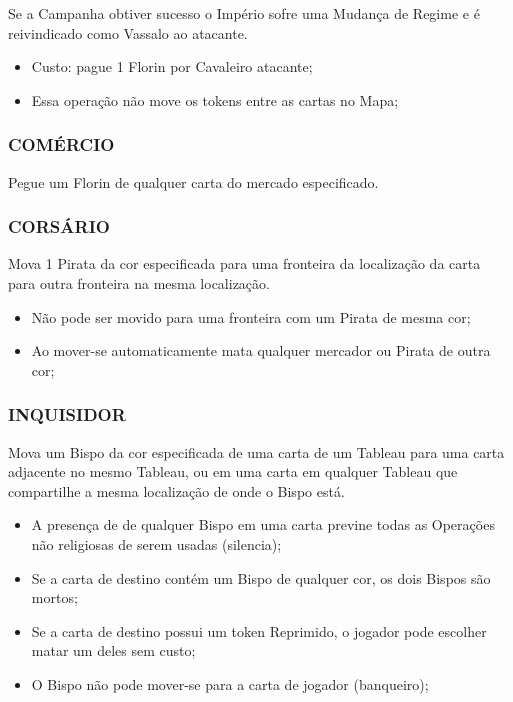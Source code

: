 \documentclass[11pt]{article}
\begin{document}
Se a Campanha obtiver sucesso o Império sofre uma Mudança de Regime e é reivindicado como Vassalo ao atacante.

\begin{itemize}
\item Custo: pague 1 Florin por Cavaleiro atacante;

\item Essa operação não move os tokens entre as cartas no Mapa;
\end{itemize}

\subsubsection{COMÉRCIO}
\label{sec:orge8668d0}

Pegue um Florin de qualquer carta do mercado especificado.

\subsubsection{CORSÁRIO}
\label{sec:org6a47418}

Mova 1 Pirata da cor especificada para uma fronteira da localização da carta para outra fronteira na mesma localização.

\begin{itemize}
\item Não pode ser movido para uma fronteira com um Pirata de mesma cor;

\item Ao mover-se automaticamente mata qualquer mercador ou Pirata de outra cor;
\end{itemize}

\subsubsection{INQUISIDOR}
\label{sec:org9677dee}

Mova um Bispo da cor especificada de uma carta de um Tableau para uma carta adjacente no mesmo Tableau, ou em uma carta em qualquer Tableau que compartilhe a mesma localização de onde o Bispo está.

\begin{itemize}
\item A presença de de qualquer Bispo em uma carta previne todas as Operações não religiosas de serem usadas (silencia);

\item Se a carta de destino contém um Bispo de qualquer cor, os dois Bispos são mortos;

\item Se a carta de destino possui um token Reprimido, o jogador pode escolher matar um deles sem custo;

\item O Bispo não pode mover-se para a carta de jogador (banqueiro);
\end{itemize}
\end{document}
